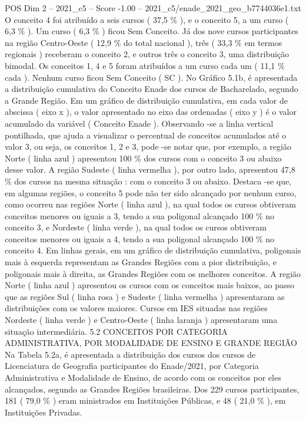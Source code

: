 \begin{textsample}{POS Dim 2 – 2021\_c5 – Score -1.00 – 2021\_c5/enade\_2021\_geo\_b7744036e1.txt}
O conceito 4 foi atribuído a seis cursos ( 37,5 \% ), e o conceito 5, a um curso ( 6,3 \% ).
Um curso ( 6,3 \% ) ficou Sem Conceito.
Já dos nove cursos participantes na região Centro-Oeste ( 12,9 \% do total nacional ), três ( 33,3 \% em termos regionais ) receberam o conceito 2, e outros três o conceito 3, uma distribuição bimodal.
Os conceitos 1, 4 e 5 foram atribuídos a um curso cada um ( 11,1 \% cada ).
Nenhum curso ficou Sem Conceito ( SC ).
No Gráfico 5.1b, é apresentada a distribuição cumulativa do Conceito Enade dos cursos de Bacharelado, segundo a Grande Região.
Em um gráfico de distribuição cumulativa, em cada valor de abscissa ( eixo x ), o valor apresentado no eixo das ordenadas ( eixo y ) é o valor acumulado da variável ( Conceito Enade ).
Observando -se a linha vertical pontilhada, que ajuda a visualizar o percentual de conceitos acumulados até o valor 3, ou seja, os conceitos 1, 2 e 3, pode -se notar que, por exemplo, a região Norte ( linha azul ) apresentou 100 \% dos cursos com o conceito 3 ou abaixo desse valor.
A região Sudeste ( linha vermelha ), por outro lado, apresentou 47,8 \% dos cursos na mesma situação : com o conceito 3 ou abaixo.
Destaca -se que, em algumas regiões, o conceito 5 pode não ter sido alcançado por nenhum curso, como ocorreu nas regiões Norte ( linha azul ), na qual todos os cursos obtiveram conceitos menores ou iguais a 3, tendo a sua poligonal alcançado 100 \% no conceito 3, e Nordeste ( linha verde ), na qual todos os cursos obtiveram conceitos menores ou iguais a 4, tendo a sua poligonal alcançado 100 \% no conceito 4.
Em linhas gerais, em um gráfico de distribuição cumulativa, poligonais mais à esquerda representam as Grandes Regiões com a pior distribuição, e poligonais mais à direita, as Grandes Regiões com os melhores conceitos.
A região Norte ( linha azul ) apresentou os cursos com os conceitos mais baixos, ao passo que as regiões Sul ( linha rosa ) e Sudeste ( linha vermelha ) apresentaram as distribuições com os valores maiores.
Cursos em IES situadas nas regiões Nordeste ( linha verde ) e Centro-Oeste ( linha laranja ) apresentaram uma situação intermediária. 5.2 CONCEITOS POR CATEGORIA ADMINISTRATIVA, POR MODALIDADE DE ENSINO E GRANDE REGIÃO Na Tabela 5.2a, é apresentada a distribuição dos cursos dos cursos de Licenciatura de Geografia participantes do Enade/2021, por Categoria Administrativa e Modalidade de Ensino, de acordo com os conceitos por eles alcançados, segundo as Grandes Regiões brasileiras.
Dos 229 cursos participantes, 181 ( 79,0 \% ) eram ministrados em Instituições Públicas, e 48 ( 21,0 \% ), em Instituições Privadas.

\end{textsample}
